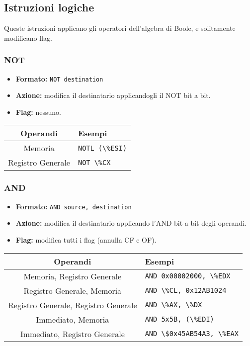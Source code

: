 \documentclass[a4paper,11pt]{article}
\begin{document}
\subsection{Istruzioni logiche}
Queste istruzioni applicano gli operatori dell'algebra di Boole, e solitamente modificano flag.

\subsubsection{NOT}
\begin{itemize}
	\item \textbf{Formato:} \lstinline|NOT destination|
	\item \textbf{Azione:} modifica il destinatario applicandogli il NOT bit a bit. 
	\item \textbf{Flag:} nessuno. 
\end{itemize}

		\begin{table}[H]
		\center {}
			\begin{tabular} { c | p{5cm} }
				\bfseries Operandi & \bfseries Esempi \\
				\hline
				Memoria & \lstinline|NOTL (\%ESI)| \\ 
				Registro Generale & \lstinline|NOT \%CX| 
			\end{tabular}
		\end{table}

\subsubsection{AND}
\begin{itemize}
	\item \textbf{Formato:} \lstinline|AND source, destination|
	\item \textbf{Azione:} modifica il destinatario applicando l'AND bit a bit degli operandi. 
	\item \textbf{Flag:} modifica tutti i flag (annulla CF e OF).
\end{itemize}

		\begin{table}[H]
		\center {}
			\begin{tabular} { c | p{5cm} }
				\bfseries Operandi & \bfseries Esempi \\
				\hline
				Memoria, Registro Generale & \lstinline|AND 0x00002000, \%EDX| \\ 
				Registro Generale, Memoria & \lstinline|AND \%CL, 0x12AB1024| \\ 
				Registro Generale, Registro Generale & \lstinline|AND \%AX, \%DX| \\ 
				Immediato, Memoria & \lstinline|AND 5x5B, (\%EDI)| \\ 
				Immediato, Registro Generale & \lstinline|AND \$0x45AB54A3, \%EAX|
			\end{tabular}
		\end{table}
\end{document}
